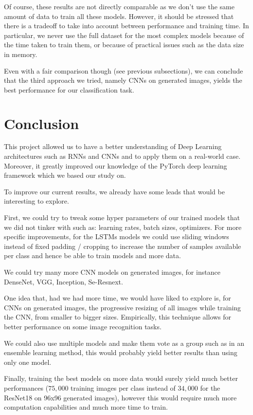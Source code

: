\documentclass[10pt,twocolumn,letterpaper]{article}
\begin{document}
Of course, these results are not directly comparable as we don't use the same amount of data to train all these models. However, it should be stressed that there is a tradeoff to take into account between performance and training time. In particular, we never use the full dataset for the most complex models because of the time taken to train them, or because of practical issues such as the data size in memory.

Even with a fair comparison though (see previous subsections), we can conclude that the third approach we tried, namely CNNs on generated images, yields the best performance for our classification task.

\section{Conclusion}

This project allowed us to have a better understanding of Deep Learning architectures such as RNNs and CNNs and to apply them on a real-world case. Moreover, it greatly improved our knowledge of the PyTorch deep learning framework which we based our study on.

To improve our current results, we already have some leads that would be interesting to explore.

First, we could try to tweak some hyper parameters of our trained models that we did not tinker with such as: learning rates, batch sizes, optimizers. For more specific improvements, for the LSTMs models we could use sliding windows instead of fixed padding / cropping to increase the number of samples available per class and hence be able to train models and more data.

We could try many more CNN models on generated images, for instance DenseNet, VGG, Inception, Se-Resnext.

One idea that, had we had more time, we would have liked to explore is, for CNNs on generated images, the progressive resizing of all images while training the CNN, from smaller to bigger sizes. \cite{ProgressiveResizing} Empirically, this technique allows for better performance on some image recognition tasks.

We could also use multiple models and make them vote as a group such as in an ensemble learning method, this would probably yield better results than using only one model.

Finally, training the best models on more data would surely yield much better performances ($75,000$ training images per class instead of $34,000$ for the ResNet18 on 96x96 generated images), however this would require much more computation capabilities and much more time to train.

{\small


}
\end{document}
